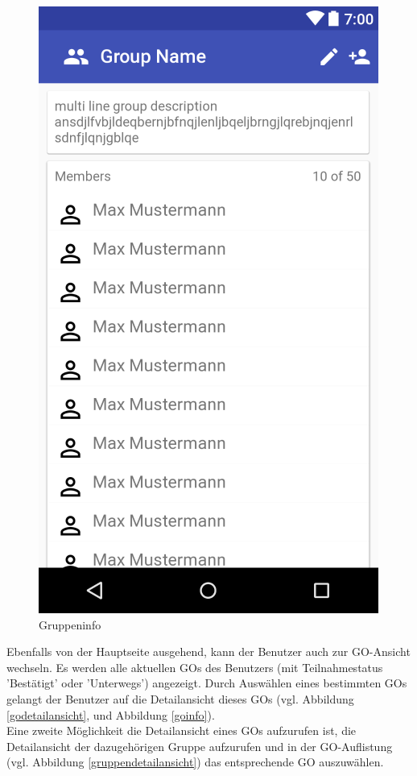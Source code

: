 \documentclass[parskip=full]{scrartcl}
\begin{document}
\begin{figure}[H]
\begin{minipage}[b]{0.4\textwidth}
    \includegraphics[width=\textwidth]{GUI/AndroidStudio/group_info.PNG}
	\caption{Gruppeninfo}\label{gruppeninfo}
  \end{minipage}
  \vspace{1cm}
\end{figure}

Ebenfalls von der Hauptseite ausgehend, kann der Benutzer auch zur GO-Ansicht wechseln. Es werden alle aktuellen GOs des Benutzers (mit Teilnahmestatus 'Bestätigt' oder 'Unterwegs') angezeigt. Durch Auswählen eines bestimmten GOs gelangt der Benutzer auf die Detailansicht dieses GOs (vgl. Abbildung \ref{godetailansicht}, und Abbildung \ref{goinfo}).\\
Eine zweite Möglichkeit die Detailansicht eines GOs aufzurufen ist, die Detailansicht der dazugehörigen Gruppe aufzurufen und in der GO-Auflistung (vgl. Abbildung \ref{gruppendetailansicht}) das entsprechende GO auszuwählen. \\
\end{document}
